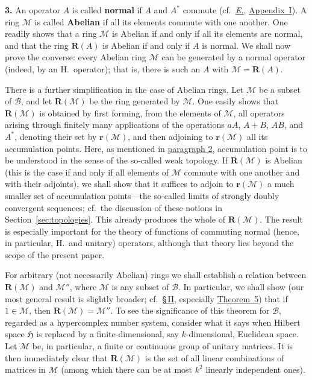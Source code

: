 \documentclass[
  paper=b5,
  twoside=true,
  fontsize=13pt,
  headings=normal,
  bookmarkpackage=false
]{scrartcl}
\theoremstyle{definition}
\newcommand{\TheoremRef}[1]{\hyperref[thm:#1]{Theorem~#1}}
\newcommand{\Eref}{\hyperref[fn:E-paper]{\emph{E.}}}
\newcommand{\ErefText}[1]{\href{https://doi.org/10.1007/BF01782338}{#1}}
\newcommand{\GeneratedRing}{\boldsymbol{R}}
\newcommand{\AlgebraicRing}{\boldsymbol{r}}
\begin{document}
\medskip
{}
\noindent\textbf{3.}\label{intro:3}
An operator $A$ is called \textbf{normal} if $A$ and $A^*$ commute (cf.\ \Eref, \ErefText{Appendix~I}). A ring $\mathcal M$ is called \textbf{Abelian} if all its elements
commute with one another. One readily shows that a ring $\mathcal M$ is
Abelian if and only if all its elements are normal, and that the ring
$\GeneratedRing (A)$ is Abelian if and only if $A$ is normal. We shall now prove the
converse: every Abelian ring $\mathcal M$ can be generated by a normal
operator (indeed, by an H.\ operator); that is, there is such an $A$ with $\mathcal M=\GeneratedRing (A)$.

There is a further simplification in the case of Abelian rings. Let
$\mathcal M$ be a subset of $\mathcal B$, and let $\GeneratedRing (\mathcal M)$ be the
ring generated by $\mathcal M$. One easily shows that $\GeneratedRing (\mathcal M)$ is
obtained by first forming, from the elements of $\mathcal M$, all operators
arising through finitely many applications of the operations $aA$, $A+B$, $AB$, and $A^*$,
denoting their set by $\AlgebraicRing (\mathcal M)$, and then adjoining to
$\AlgebraicRing (\mathcal M)$ all its accumulation points. Here, as mentioned in
\hyperref[intro:2]{paragraph 2}, accumulation point is to be understood in
the sense of the so-called weak topology. If $\GeneratedRing (\mathcal M)$ is Abelian
(this is the case if and only if all elements of $\mathcal M$ commute with
one another and with their adjoints), we shall show that it suffices to
adjoin to $\AlgebraicRing (\mathcal M)$ a much smaller set of accumulation points---the
so-called limits of strongly doubly convergent sequences; cf.\ the
discussion of these notions in Section~\ref{sec:topologies}. This already
produces the whole of $\GeneratedRing (\mathcal M)$. The result is especially important
for the theory of functions of commuting normal (hence, in particular, H.\
and unitary) operators, although that theory lies beyond the scope of the
present paper.

For arbitrary (not necessarily Abelian) rings we shall establish a relation
between $\GeneratedRing (\mathcal M)$ and $\mathcal M''$, where $\mathcal M$ is any
subset of $\mathcal B$. In particular, we shall show (our most general
result is slightly broader; cf.\
\hyperref[sec:ring-and-commutant]{\S\,II}, especially \TheoremRef{5}) that if
$1\in\mathcal M$, then $\GeneratedRing (\mathcal M)=\mathcal M''$.
To see the significance of this theorem for $\mathcal B$, regarded as a
hypercomplex number system, consider what it says when Hilbert space
$\mathfrak H$ is replaced by a finite-dimensional, say $k$-dimensional,
Euclidean space. Let $\mathcal M$ be, in particular, a finite or continuous
group of unitary matrices. It is then immediately clear that
$\GeneratedRing (\mathcal M)$ is the set of all linear combinations of matrices in
$\mathcal M$ (among which there can be at most $k^2$ linearly independent
ones).
\end{document}
